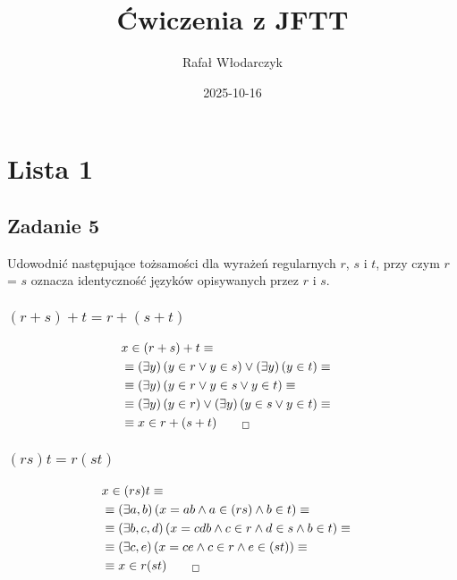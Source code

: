 \documentclass[12pt]{article}
\title{Ćwiczenia z JFTT}
\author{Rafał Włodarczyk}
\date{2025-10-16}
\begin{document}
\maketitle

\section{Lista 1}

\setcounter{subsection}{4}
\subsection{Zadanie 5}

Udowodnić następujące tożsamości dla wyrażeń regularnych $r$, $s$ i $t$, 
przy czym $r$ = $s$ oznacza identyczność języków opisywanych przez $r$ i $s$.

\subsubsection{$(r+s)+t=r+(s+t)$}

\begin{align}
    &x\in (r+s)+t \equiv&\\
    &\equiv \left(\exists y\right)\left(y\in r \lor y\in s\right) \lor \left(\exists y\right)\left(y \in t\right) \equiv\\
    &\equiv \left(\exists y\right)\left(y\in r \lor y\in s \lor y\in t\right) \equiv\\
    &\equiv \left(\exists y\right)\left(y\in r\right) \lor \left(\exists y\right)\left(y \in s \lor y \in t\right) \equiv\\
    &\equiv x\in r+(s+t)_{\qed}
\end{align}

\subsubsection{$(rs)t=r(st)$}

\begin{align}
    &x\in (rs)t \equiv&\\
    &\equiv \left(\exists a,b \right)\left(x=ab \land a\in(rs) \land b\in t\right) \equiv\\
    &\equiv \left(\exists b,c,d \right)\left(x=cdb \land c\in r \land d\in s \land b\in t\right) \equiv\\
    &\equiv \left(\exists c,e \right)\left(x=ce \land c\in r \land e\in(st)\right) \equiv\\
    &\equiv x\in r(st)_{\qed}
\end{align}
\end{document}
